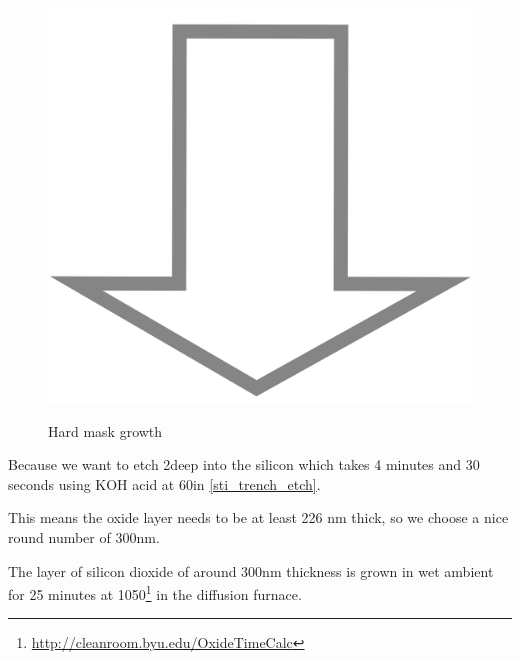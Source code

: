 \begin{figure}[H]
	\centering
	\begin{tikzpicture}[node distance = 3cm, auto, thick,scale=\CrossSectionOnly, every node/.style={transform shape}]
		
	\end{tikzpicture} \\
	\includegraphics[scale=0.01]{down_arrow.png} \\
	\begin{tikzpicture}[node distance = 3cm, auto, thick,scale=\CrossSectionOnly, every node/.style={transform shape}]
		
	\end{tikzpicture}
	\caption{Hard mask growth}
\end{figure}

Because we want to etch 2\um deep into the silicon which takes 4 minutes and 30 seconds using KOH acid at 60\degreesC in \autoref{sti_trench_etch}.

This means the oxide layer needs to be at least 226 nm thick, so we choose a nice round number of 300nm.

The layer of silicon dioxide of around 300nm thickness is grown in wet ambient for 25 minutes at 1050\degreesC\footnote{\url{http://cleanroom.byu.edu/OxideTimeCalc}} in the diffusion furnace.

\newpage

